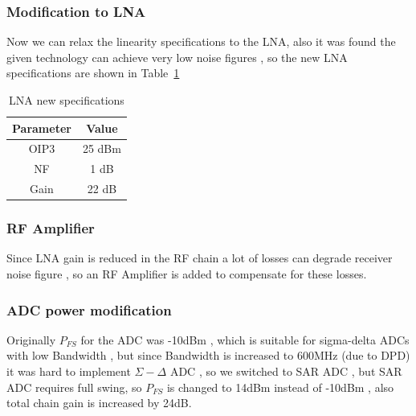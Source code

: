 \subsubsection{Modification to LNA}%
Now we can relax the linearity specifications to the LNA, also
it was found the given technology can achieve very low noise 
figures , so the new LNA specifications are shown in 
Table~\ref{tab:LNA_new_specs}
\begin{table}[htpb]
    \centering
    \caption{LNA new specifications}
    \label{tab:LNA_new_specs}
    \begin{tabular}{|c|c|}
        \hline
        Parameter & Value \\ \hline
        OIP3 & 25 dBm \\ \hline
        NF & 1 dB \\ \hline
        Gain & 22 dB \\ \hline
    \end{tabular}
\end{table}
\subsubsection{RF Amplifier}%
Since LNA gain is reduced in the RF chain a lot of losses can 
degrade receiver noise figure , so an RF Amplifier is added 
to compensate for these losses.

\subsubsection{ADC power modification}%
Originally $P_{FS}$ for the ADC was -10dBm , which is suitable 
for sigma-delta ADCs with low Bandwidth , but since Bandwidth is 
increased to 600MHz (due to DPD) it was hard to implement 
$\Sigma - \Delta $ ADC , so we switched to SAR ADC , but SAR 
ADC requires full swing, so $P_{FS}$ is changed to 14dBm instead
of -10dBm , also total chain gain is increased by 24dB.

